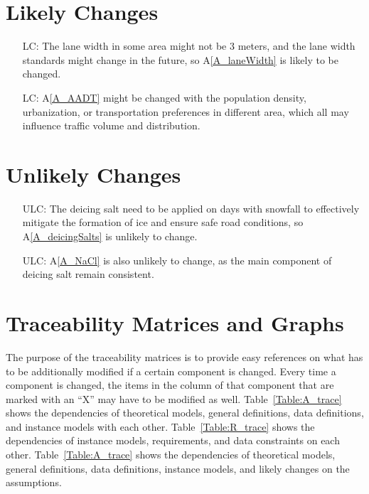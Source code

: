 \documentclass[12pt]{article}
\newcommand{\aref}[1]{A\ref{#1}}
\newcounter{lcnum} %
\newcounter{ulcnum} %
\begin{document}
\section{Likely Changes}    

\noindent \begin{itemize}

\item[LC\refstepcounter{lcnum}\thelcnum\label{LC_laneWidth}:] The lane width in some area might not be 3 meters, and the lane width standards might change in the future, so \aref{A_laneWidth} is likely to be changed. 
\item[LC\refstepcounter{lcnum}\thelcnum\label{LC_AADT}:] \aref{A_AADT} might be changed with the population density, urbanization, or transportation preferences in different area, which all may influence traffic volume and distribution.

\end{itemize}

\section{Unlikely Changes}    

\noindent \begin{itemize}
\item[ULC\refstepcounter{ulcnum}\theulcnum\label{ULC_saltSame}:] The deicing salt need to be applied on days with snowfall to effectively mitigate the formation of ice and ensure safe road conditions, so \aref{A_deicingSalts} is unlikely to change.

\item[ULC\refstepcounter{ulcnum}\theulcnum\label{ULC_NaCl}:] \aref{A_NaCl} is also unlikely to change, as the main component of deicing salt remain consistent.


\end{itemize}

\section{Traceability Matrices and Graphs}

The purpose of the traceability matrices is to provide easy references on what
has to be additionally modified if a certain component is changed.  Every time a
component is changed, the items in the column of that component that are marked
with an ``X'' may have to be modified as well.  Table~\ref{Table:A_trace} shows the
dependencies of theoretical models, general definitions, data definitions, and
instance models with each other. Table~\ref{Table:R_trace} shows the
dependencies of instance models, requirements, and data constraints on each
other. Table~\ref{Table:A_trace} shows the dependencies of theoretical models,
general definitions, data definitions, instance models, and likely changes on
the assumptions.
\end{document}
